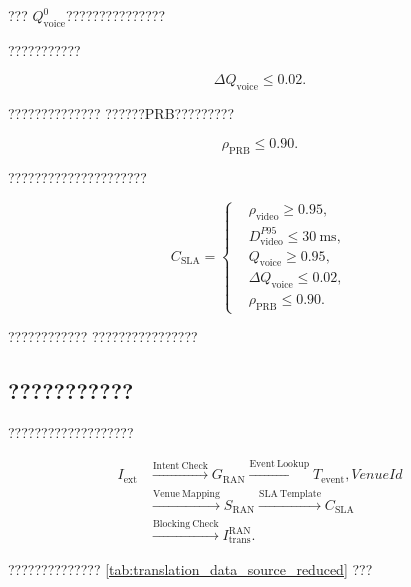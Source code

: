 ???
$Q_{\mathrm{voice}}^{0}$???????????????

???????????

\begin{equation}
\Delta Q_{\mathrm{voice}}
\leq
0.02.
\label{eq:translated_voice_degradation_sla}
\end{equation}

??????????????
??????PRB?????????

\begin{equation}
\rho_{\mathrm{PRB}}
\leq
0.90.
\label{eq:translated_prb_sla}
\end{equation}

?????????????????????

\begin{equation}
C_{\mathrm{SLA}}
=
\left\{
\begin{aligned}
&\rho_{\mathrm{video}}\geq0.95,\\
&D_{\mathrm{video}}^{P95}\leq30~\mathrm{ms},\\
&Q_{\mathrm{voice}}\geq0.95,\\
&\Delta Q_{\mathrm{voice}}\leq0.02,\\
&\rho_{\mathrm{PRB}}\leq0.90.
\end{aligned}
\right.
\label{eq:translated_sla_set}
\end{equation}

????????????
????????????????


\subsection*{???????????}

???????????????????

\begin{equation}
\begin{aligned}
I_{\mathrm{ext}}
&\xrightarrow{\mathrm{Intent\ Check}}
G_{\mathrm{RAN}}
\xrightarrow{\mathrm{Event\ Lookup}}
T_{\mathrm{event}},VenueId
\\
&\xrightarrow{\mathrm{Venue\ Mapping}}
S_{\mathrm{RAN}}
\xrightarrow{\mathrm{SLA\ Template}}
C_{\mathrm{SLA}}
\\
&\xrightarrow{\mathrm{Blocking\ Check}}
I_{\mathrm{trans}}^{\mathrm{RAN}}.
\end{aligned}
\label{eq:static_translation_flow_reduced}
\end{equation}

??????????????
\ref{tab:translation_data_source_reduced}
???

